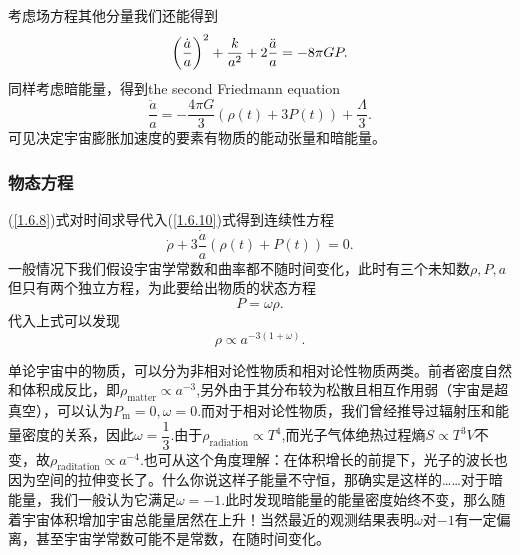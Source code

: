 \documentclass[../天体物理基础.tex]{subfiles}
\begin{document}
考虑场方程其他分量我们还能得到
\begin{equation}
\left(\frac{\dot{a}}{a}\right)^{2}+\frac{k}{a^{2}}+2\frac{\ddot{a}}{a}=-8\pi GP.\\
\end{equation}
同样考虑暗能量，得到the second Friedmann equation
\begin{equation}
\frac{\ddot{a}}{a}=-\frac{4\pi G}{3}\left(\rho\left(t\right)+3P\left(t\right)\right)+\frac{\Lambda}{3}.\label{1.6.10}
\end{equation}
可见决定宇宙膨胀加速度的要素有物质的能动张量和暗能量。

\subsubsection{物态方程}
(\ref{1.6.8})式对时间求导代入(\ref{1.6.10})式得到连续性方程
\begin{equation}
\dot{\rho}+3\frac{\dot{a}}{a}\left(\rho\left(t\right)+P\left(t\right)\right)=0.
\end{equation}
一般情况下我们假设宇宙学常数和曲率都不随时间变化，此时有三个未知数$\rho,P,a$但只有两个独立方程，为此要给出物质的状态方程
\begin{equation}
P=\omega\rho.
\end{equation}
代入上式可以发现
\begin{equation}
\rho\propto{}a^{-3\left(1+\omega\right)}.
\end{equation}

单论宇宙中的物质，可以分为非相对论性物质和相对论性物质两类。前者密度自然和体积成反比，即$\rho_{\text{matter}}\propto a^{-3}$,另外由于其分布较为松散且相互作用弱（宇宙是超真空），可以认为$P_{\text{m}}=0,\omega=0$.而对于相对论性物质，我们曾经推导过辐射压和能量密度的关系，因此$\omega=\dfrac{1}{3}$.由于$\rho_{\text{radiation}}\propto{}T^{4}$,而光子气体绝热过程熵$S\propto{}T^{3}V$不变，故$\rho_{\text{raditation}}\propto{}a^{-4}$.也可从这个角度理解：在体积增长的前提下，光子的波长也因为空间的拉伸变长了。什么你说这样子能量不守恒，那确实是这样的……对于暗能量，我们一般认为它满足$\omega=-1$.此时发现暗能量的能量密度始终不变，那么随着宇宙体积增加宇宙总能量居然在上升！当然最近的观测结果表明$\omega$对$-1$有一定偏离，甚至宇宙学常数可能不是常数，在随时间变化。
\end{document}
